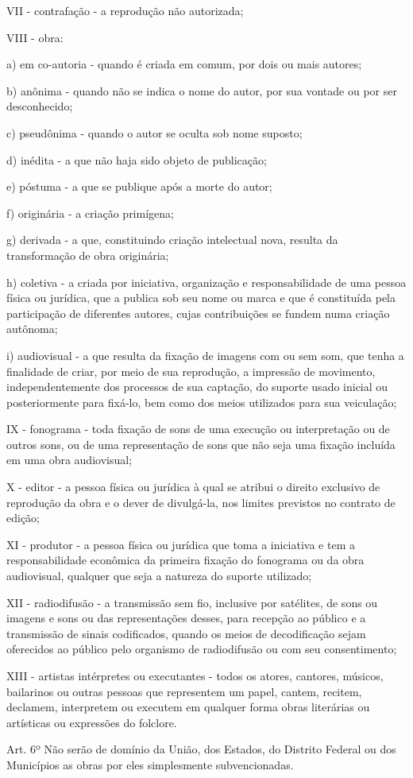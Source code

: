 {VII - contrafação - a reprodução não autorizada;

VIII - obra: 

a) em co-autoria - quando é criada em comum, por dois ou mais autores;

b) anônima - quando não se indica o nome do autor, por sua vontade ou por ser desconhecido;

c) pseudônima - quando o autor se oculta sob nome suposto;

d) inédita - a que não haja sido objeto de publicação;

e) póstuma - a que se publique após a morte do autor;

f) originária - a criação primígena;

g) derivada - a que, constituindo criação intelectual nova, resulta da transformação de obra originária;

h) coletiva - a criada por iniciativa, organização e responsabilidade de uma pessoa física ou jurídica, que a publica sob seu nome ou marca e que é constituída pela participação de diferentes autores, cujas contribuições se fundem numa criação autônoma;

i) audiovisual - a que resulta da fixação de imagens com ou sem som, que tenha a finalidade de criar, por meio de sua reprodução, a impressão de movimento, independentemente dos processos de sua captação, do suporte usado inicial ou posteriormente para fixá-lo, bem como dos meios utilizados para sua veiculação;

IX - fonograma - toda fixação de sons de uma execução ou interpretação ou de outros sons, ou de uma representação de sons que não seja uma fixação incluída em uma obra audiovisual;

X - editor - a pessoa física ou jurídica à qual se atribui o direito exclusivo de reprodução da obra e o dever de divulgá-la, nos limites previstos no contrato de edição; 

XI - produtor - a pessoa física ou jurídica que toma a iniciativa e tem a responsabilidade econômica da primeira fixação do fonograma ou da obra audiovisual, qualquer que seja a natureza do suporte utilizado;

XII - radiodifusão - a transmissão sem fio, inclusive por satélites, de sons ou imagens e sons ou das representações desses, para recepção ao público e a transmissão de sinais codificados, quando os meios de decodificação sejam oferecidos ao público pelo organismo de radiodifusão ou com seu consentimento;

XIII - artistas intérpretes ou executantes - todos os atores, cantores, músicos, bailarinos ou outras pessoas que representem um papel, cantem, recitem, declamem, interpretem ou executem em qualquer forma obras literárias ou artísticas ou expressões do folclore.

Art. 6º Não serão de domínio da União, dos Estados, do Distrito Federal ou dos Municípios as obras por eles simplesmente subvencionadas.
}

